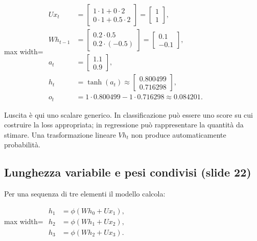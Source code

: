 \documentclass[11pt,a4paper,oneside,openany]{book}
\begin{document}
\begin{center}
\begin{adjustbox}{max width=\linewidth}
$\displaystyle 
\begin{aligned}
Ux_t&=\begin{bmatrix}1\cdot1+0\cdot2\\0\cdot1+0.5\cdot2\end{bmatrix}
=\begin{bmatrix}1\\1\end{bmatrix},\\
Wh_{t-1}&=\begin{bmatrix}0.2\cdot0.5\\0.2\cdot(-0.5)\end{bmatrix}
=\begin{bmatrix}0.1\\-0.1\end{bmatrix},\\
a_t&=\begin{bmatrix}1.1\\0.9\end{bmatrix},\\
h_t&=\tanh(a_t)\approx\begin{bmatrix}0.800499\\0.716298\end{bmatrix},\\
o_t&=1\cdot0.800499-1\cdot0.716298\approx0.084201.
\end{aligned}
$
\end{adjustbox}
\end{center}

L\textquotesingle uscita è qui uno scalare generico. In classificazione può essere uno score su cui costruire la loss appropriata; in regressione può rappresentare la quantità da stimare. Una trasformazione lineare \(Vh_t\) non produce automaticamente probabilità.

\subsection{Lunghezza variabile e pesi condivisi (slide 22)}\label{f03-r319}

Per una sequenza di tre elementi il modello calcola:

\begin{center}
\begin{adjustbox}{max width=\linewidth}
$\displaystyle 
\begin{aligned}
h_1&=\phi(Wh_0+Ux_1),\\
h_2&=\phi(Wh_1+Ux_2),\\
h_3&=\phi(Wh_2+Ux_3).
\end{aligned}
$
\end{adjustbox}
\end{center}
\end{document}
